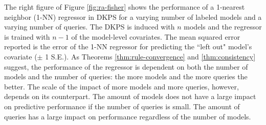The right figure of Figure \ref{fig:ra-fisher} shows the performance of a 1-nearest neighbor (1-NN) regressor in DKPS for a varying number of labeled models and a varying number of queries. 
The DKPS is induced with $ n $ models and the regressor is trained with $ n - 1 $ of the model-level covariates. 
The mean squared error reported is the error of the 1-NN regressor for predicting the ``left out" model's covariate ($\pm$ 1 S.E.).
As Theorems \ref{thm:rule-convergence} and \ref{thm:consistency} suggest, the performance of the regressor is dependent on both the number of models and the number of queries: the more models and the more queries the better.
The scale of the impact of more models and more queries, however, depends on its counterpart. 
The amount of models does not have a large impact on predictive performance if the number of queries is small. 
The amount of queries has a large impact on performance regardless of the number of models.